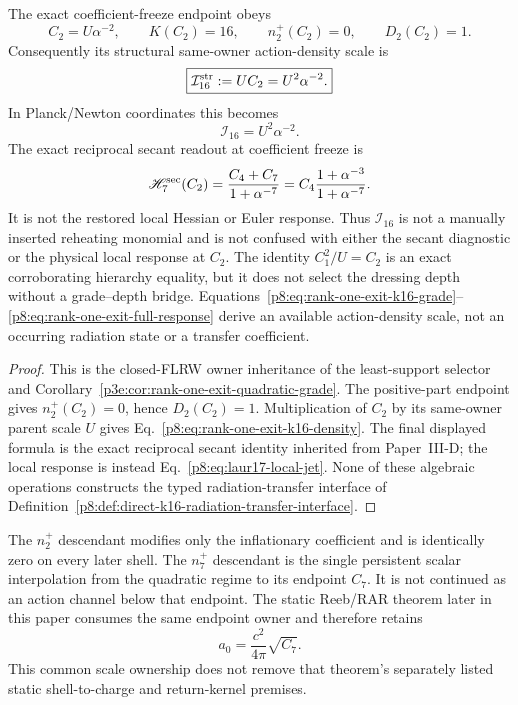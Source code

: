 \documentclass[12pt,a4paper]{article}
\begin{document}
\begin{corollary}[Depth-two dressing selects the exact \(K=16\) density scale]
\label{p8:cor:rank-one-exit-k16-density}
The exact coefficient-freeze endpoint obeys
\begin{equation}
\label{p8:eq:rank-one-exit-k16-grade}
 \boxed{C_2=U\alpha^{-2},\qquad K(C_2)=16,
 \qquad n_2^+(C_2)=0,\qquad D_2(C_2)=1.}
\end{equation}
Consequently its structural same-owner action-density scale is
\begin{equation}
\label{p8:eq:rank-one-exit-k16-density}
 \boxed{
 \mathcal I_{16}^{\rm str}
 :=U C_2
 =U^2\alpha^{-2}.}
\end{equation}
In Planck/Newton coordinates this becomes
\[
 \mathcal I_{16}=U^2\alpha^{-2}.
\]
The exact reciprocal secant readout at coefficient freeze is
\begin{equation}
\label{p8:eq:rank-one-exit-full-response}
 \mathscr H_7^{\rm sec}(C_2)
 =\frac{C_4+C_7}{1+\alpha^{-7}}
 =C_4\frac{1+\alpha^{-3}}{1+\alpha^{-7}}.
\end{equation}
It is not the restored local Hessian or Euler response.  Thus
\(\mathcal I_{16}\) is not a manually inserted reheating monomial and is not
confused with either the secant diagnostic or the physical local response at
\(C_2\).
The identity \(C_1^2/U=C_2\) is an exact corroborating hierarchy equality,
but it does not select the dressing depth without a grade--depth bridge.
Equations~\eqref{p8:eq:rank-one-exit-k16-grade}--
\eqref{p8:eq:rank-one-exit-full-response} derive an available action-density
scale, not an occurring radiation state or a transfer coefficient.
\end{corollary}

\begin{proof}
This is the closed-FLRW owner inheritance of the least-support selector and
Corollary~\ref{p3e:cor:rank-one-exit-quadratic-grade}.  The positive-part
endpoint gives \(n_2^+(C_2)=0\), hence \(D_2(C_2)=1\).  Multiplication of \(C_2\) by its same-owner parent scale \(U\) gives
Eq.~\eqref{p8:eq:rank-one-exit-k16-density}.  The final displayed formula is the exact reciprocal secant identity inherited from Paper~III-D; the local response is instead Eq.~\eqref{p8:eq:laur17-local-jet}.  None of these algebraic
operations constructs the typed radiation-transfer interface of
Definition~\ref{p8:def:direct-k16-radiation-transfer-interface}.
\end{proof}

\begin{remark}
\label{p8:rem:n7-rar-owner}
The \(n_2^+\) descendant modifies only the inflationary coefficient and is
identically zero on every later shell.  The \(n_7^+\) descendant is the single
persistent scalar interpolation from the quadratic regime to its endpoint
\(C_7\).  It is not continued as an action channel below that endpoint.  The
static Reeb/RAR theorem later in this paper consumes the same endpoint owner
and therefore retains
\[
 a_0=\frac{c^2}{4\pi}\sqrt{C_7}.
\]
This common scale ownership does not remove that theorem's separately listed
static shell-to-charge and return-kernel premises.
\end{remark}
\end{document}

